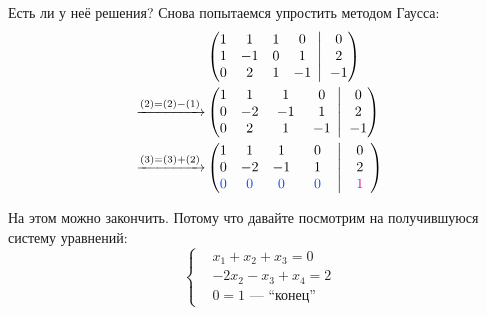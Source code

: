 \documentclass[a4paper,12pt]{article}
\newcommand{\BigMiddleThree}{\;\left|\vphantom{\begin{pmatrix} 0\\0\\0 \end{pmatrix}}\right.\;}
\begin{document}
  Есть ли у неё решения?
  Снова попытаемся упростить методом Гаусса:
  \begin{equation*}
  \begin{split}
    &\left(
      \begin{matrix}
        1 & 1 & 1 & 0\\
        1 & -1 & 0 & 1\\
        0 & 2 & 1 & -1
      \end{matrix}
      \BigMiddleThree
      \begin{matrix}
        0\\
        2\\
        -1
      \end{matrix}
    \right)\\
    \xrightarrow{(2) = (2) - (1)} &\left(
      \begin{matrix}
        1 & 1 & 1 & 0\\
        0 & -2 & -1 & 1\\
        0 & 2 & \hphantom{\makebox[7pt][l]{}}1\hphantom{\makebox[7pt][l]{}} & {-1}
      \end{matrix}
      \BigMiddleThree
      \begin{matrix}
        0\\
        2\\
        -1
      \end{matrix}
    \right)\\
    \xrightarrow{(3) = (3) + (2)} &\left(
      \begin{matrix}
        1 & 1 & 1 & 0\\
        0 & -2 & -1 & 1\\
        \textcolor{blue}{0} & \textcolor{blue}{0} & \textcolor{blue}{0} & \hphantom{\makebox[7pt][l]{}}\textcolor{blue}{0}\hphantom{\makebox[7pt][l]{}}
      \end{matrix}
      \BigMiddleThree
      \begin{matrix}
        0\\
        2\\
        \hphantom{\makebox[5pt][l]{}}\textcolor{pink}{1}\hphantom{\makebox[5pt][l]{}}
      \end{matrix}
    \right)
  \end{split}
  \end{equation*}

  На этом можно закончить.
  Потому что давайте посмотрим на получившуюся систему уравнений:
  \[
    \left\{
      \begin{aligned}
        &x_1 + x_2 + x_3 = 0\\
        &-2x_2 - x_3 + x_4 = 2\\
        &\boxed{0 = 1} \mbox{\ ---~``конец''}
      \end{aligned}
    \right.
  \]
\end{document}
